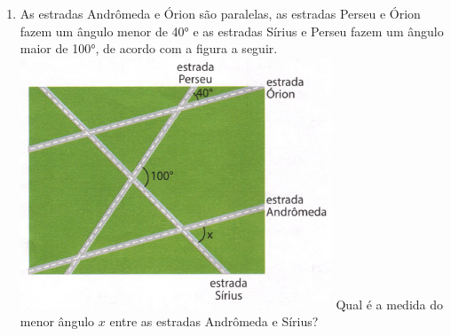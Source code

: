 \documentclass[a4paper,14pt]{article}
\begin{document}
\begin{multicols}{2}
\begin{enumerate}
			\item As estradas Andrômeda e Órion são paralelas, as estradas Perseu e Órion fazem um ângulo menor de 40° e as estradas Sírius e Perseu fazem um ângulo maior de 100°, de acordo com a figura a seguir. \\
			\includegraphics[width=1\linewidth]{6FMA144_imagens/imagem12}
			Qual é a medida do menor ângulo $x$ entre as estradas Andrômeda e Sírius?
		\end{enumerate}

\end{multicols}
\end{document}
